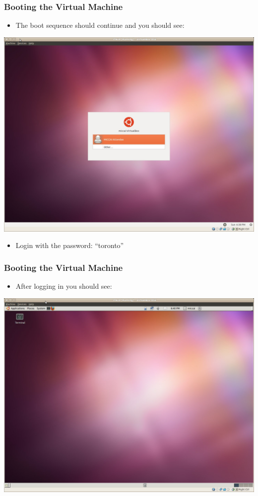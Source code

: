 \begin{frame}
\frametitle{Booting the Virtual Machine}
\begin{itemize}
\item The boot sequence should continue and you should see:
\end{itemize}
\begin{center}
  \includegraphics[width=0.7\paperwidth]{../Art/Screenshot-ITKv4-VirtualBox-01.jpg}
\end{center}
\begin{itemize}
\item Login with the password: ``toronto''
\end{itemize}
\end{frame}

\begin{frame}
\frametitle{Booting the Virtual Machine}
\begin{itemize}
\item After logging in you should see:
\end{itemize}
\begin{center}
  \includegraphics[width=0.7\paperwidth]{../Art/Screenshot-ITKv4-VirtualBox-02.jpg}
\end{center}
\end{frame}



